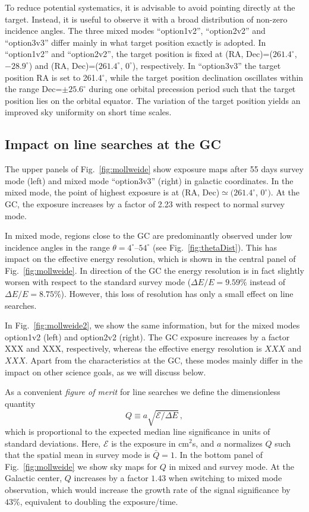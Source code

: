 \documentclass[aps,prd,superscriptaddress,showpacs,nofootinbib,fixlfloat, 12pt]{revtex4-1}
\begin{document}
To reduce potential systematics, it is advisable to avoid pointing directly at
the target. Instead, it is useful to observe it with a broad distribution of
non-zero incidence angles. The three mixed modes ``option1v2'', ``option2v2''
and ``option3v3'' differ mainly in what target position exactly is adopted.
In ``option1v2'' and ``option2v2'', the target position is fixed at (RA,
Dec)=($261.4^\circ$, $-28.9^\circ$) and (RA, Dec)=($261.4^\circ$, $0^\circ$),
respectively.  In ``option3v3'' the target position RA is set to
261.4$^\circ$, while the target position declination oscillates within the
range Dec=$\pm25.6^\circ$ during one orbital precession period such that the
target position lies on the orbital equator.  The variation of the target
position yields an improved sky uniformity on short time scales. 

\subsection{Impact on line searches at the GC}
The upper panels of Fig.~\ref{fig:mollweide} show exposure maps after 55 days
survey mode (left) and mixed mode ``option3v3'' (right) in galactic
coordinates.  In the mixed mode, the point of highest exposure is at (RA,
Dec)$\simeq(261.4^\circ$, $0^\circ)$. At the GC, the exposure increases by a
factor of 2.23 with respect to normal survey mode.

In mixed mode, regions close to the GC are predominantly observed
under low incidence angles in the range $\theta=4^\circ$--$54^\circ$ (see
Fig.~\ref{fig:thetaDist}). This has impact on the effective energy resolution,
which is shown in the central panel of Fig.~\ref{fig:mollweide}. In direction
of the GC the energy resolution is in fact slightly worsen with respect to the
standard survey mode ($\Delta E/E=9.59\%$ instead of $\Delta E/E=8.75\%$).
However, this loss of resolution has only a small effect on line searches.

In Fig.~\ref{fig:mollweide2}, we show the same information, but for the mixed
modes option1v2 (left) and option2v2 (right). The GC exposure increases by a
factor XXX and XXX, respectively, whereas the effective energy resolution is
$XXX$ and $XXX$. Apart from the characteristics at the GC, these modes mainly
differ in the impact on other science goals, as we will discuss below.
\medskip

As a convenient \emph{figure of merit} for line searches we define the
dimensionless quantity $$Q\equiv a\sqrt{\mathcal{E}/\Delta E}\,,$$ which is
proportional to the expected median line significance in units of standard
deviations.  Here, $\mathcal{E}$ is the exposure in cm$^2$s, and $a$
normalizes $Q$ such that the spatial mean in survey mode is $\bar Q=1$. In the
bottom panel of Fig.~\ref{fig:mollweide} we show sky maps for $Q$ in mixed and
survey mode.  At the Galactic center, $Q$ increases by a factor $1.43$ when
switching to mixed mode observation, which would increase the growth rate of
the signal significance by $43\%$, equivalent to doubling the exposure/time. 
\end{document}
